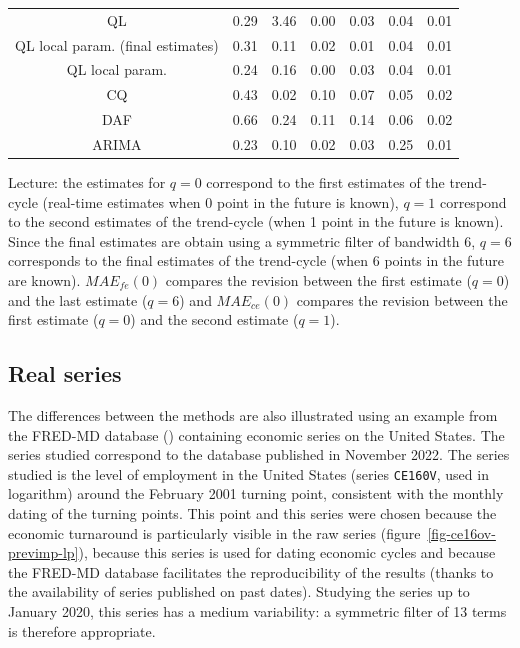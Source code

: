 \documentclass[
]{article}
\newcommand\1{\mathds{1}}
\begin{document}
\begin{longtable}[t]{ccccccc}
\hspace{1em}QL & 0.29 & 3.46 & 0.00 & 0.03 & 0.04 & 0.01\\
\hspace{1em}QL local param. (final estimates) & 0.31 & 0.11 & 0.02 & 0.01 & 0.04 & 0.01\\
\hspace{1em}QL local param. & 0.24 & 0.16 & 0.00 & 0.03 & 0.04 & 0.01\\
\hspace{1em}CQ & 0.43 & 0.02 & 0.10 & 0.07 & 0.05 & 0.02\\
\hspace{1em}DAF & 0.66 & 0.24 & 0.11 & 0.14 & 0.06 & 0.02\\
\hspace{1em}ARIMA & 0.23 & 0.10 & 0.02 & 0.03 & 0.25 & 0.01\\
\bottomrule

\end{longtable}

Lecture: the estimates for \(q=0\) correspond to the first estimates of
the trend-cycle (real-time estimates when 0 point in the future is
known), \(q=1\) correspond to the second estimates of the trend-cycle
(when 1 point in the future is known). Since the final estimates are
obtain using a symmetric filter of bandwidth 6, \(q=6\) corresponds to
the final estimates of the trend-cycle (when 6 points in the future are
known). \(MAE_{fe}(0)\) compares the revision between the first estimate
(\(q=0\)) and the last estimate (\(q=6\)) and \(MAE_{ce}(0)\) compares
the revision between the first estimate (\(q=0\)) and the second
estimate (\(q=1\)).

\subsection{Real series}\label{real-series}

The differences between the methods are also illustrated using an
example from the FRED-MD database (\textcite{fredmd}) containing
economic series on the United States. The series studied correspond to
the database published in November 2022. The series studied is the level
of employment in the United States (series \texttt{CE160V}, used in
logarithm) around the February 2001 turning point, consistent with the
monthly dating of the turning points. This point and this series were
chosen because the economic turnaround is particularly visible in the
raw series (figure~\ref{fig-ce16ov-previmp-lp}), because this series is
used for dating economic cycles and because the FRED-MD database
facilitates the reproducibility of the results (thanks to the
availability of series published on past dates). Studying the series up
to January 2020, this series has a medium variability: a symmetric
filter of 13 terms is therefore appropriate.
\end{document}

